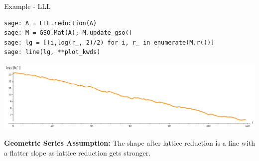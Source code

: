 \documentclass[xcolor=table,10pt,aspectratio=169]{beamer}
\begin{document}
\begin{frame}[label={sec:org31e0df5},fragile]{Example - LLL}
 \lstset{language=sage,label= ,caption= ,captionpos=b,numbers=none}
\begin{lstlisting}
sage: A = LLL.reduction(A)
sage: M = GSO.Mat(A); M.update_gso()
sage: lg = [(i,log(r_, 2)/2) for i, r_ in enumerate(M.r())]
sage: line(lg, **plot_kwds)
\end{lstlisting}

\begin{center}
\includegraphics[width=.9\linewidth]{gram-schmidt-norms-lll.png}
\end{center}

\textbf{Geometric Series Assumption:} The shape after lattice reduction is a line with a flatter slope as lattice reduction gets stronger.
\end{frame}
\end{document}
